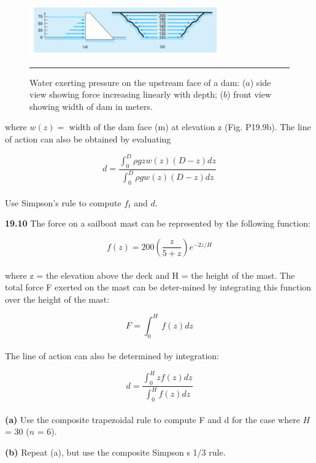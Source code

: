 \documentclass[../main.tex]{subfiles}
\begin{document}
\pagebreak
\begin{figure}[hbt!]
	\centering
	\includegraphics[width=0.75\textwidth]{pic.006}
	\caption{\textsf{Water exerting pressure on the upstream face of a dam: ($a$) side view showing force increasing
linearly with depth; ($b$) front view showing width of dam in meters.}} \hrule
	\label{pic.006}
\end{figure}

\begin{multicols}{2}
where $w(z) =$ width of the dam face (m) at elevation z
(Fig. P19.9b). The line of action can also be obtained by
evaluating

	$$d=\dfrac{\int^{D}_{0}\rho gzw(z)(D-z)dz}{\int^{D}_{0}\rho gw(z)(D-z)dz}$$\\
Use Simpson's rule to compute $f_t$ and $d$.

\textbf{19.10} The force on a sailboat mast can be represented by the
following function:

	$$f(z)=200\left(\dfrac{z}{5+z}\right)e^{-2z/H}$$\\
where z = the elevation above the deck and H = the height of
the mast. The total force F exerted on the mast can be deter-mined by integrating this function over the height of the mast:

	$$F=\int^{H}_{0}\:f(z)dz$$\\
The line of action can also be determined by integration:

	$$d=\dfrac{\int^{H}_{0} zf(z)dz}{\int^{H}_{0} f(z)dz}$$\\
	
\textbf{(a)} Use the composite trapezoidal rule to compute F and d
for the case where $H$ = 30 ($n$ = 6).

\textbf{(b)} Repeat (a), but use the composite Simpson s 1/3 rule.


\end{multicols}
\end{document}
